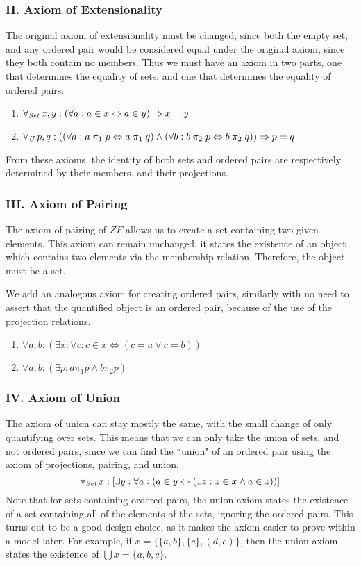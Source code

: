 \documentclass[11pt]{report}
\newcommand{\all}[1]{\forall_{\mathit{#1}}\hspace{0.5mm}}
\newcommand{\pleft}{\mathrel{\pi_1}}
\newcommand{\pright}{\mathrel{\pi_2}}
\theoremstyle{definition}
\theoremstyle{theorem}
\theoremstyle{lemma}
\begin{document}
\subsubsection*{II. Axiom of Extensionality}
The original axiom of extensionality must be changed, since both the empty set, and any ordered pair would be considered equal under the original axiom, since they both contain no members.
Thus we must have an axiom in two parts, one that determines the equality of sets, and one that determines the equality of ordered pairs.
\begin{enumerate}[label=(\roman*)]
\item $\all{Set} x,y:
        (\forall a:
          a\in x \Leftrightarrow a\in y) \Rightarrow x=y$
\item $\all{U} p,q: ((\forall a: a\pleft p \Leftrightarrow a\pleft q)
             \wedge (\forall b: b\pright p \Leftrightarrow b\pright q))
             \Rightarrow p=q$
\end{enumerate}
From these axioms, the identity of both sets and ordered pairs are respectively determined by their members, and their projections. 

\subsubsection*{III. Axiom of Pairing}
The axiom of pairing of $\mathit{ZF}$ allows us to create a set containing two given elements.
This axiom can remain unchanged, it states the existence of an object which contains two elements via the membership relation.
Therefore, the object must be a set.

We add an analogous axiom for creating ordered pairs, similarly with no need to assert that the quantified object is an ordered pair, because of the use of the projection relations.
\begin{enumerate}[label=(\roman*)]
\item $\forall a,b: (\exists x: \forall c:
          c\in x \Leftrightarrow (c=a \vee c=b))$
\item $\forall a,b: (\exists p: a\pleft p \wedge b\pright p)$
\end{enumerate}

\subsubsection*{IV. Axiom of Union}
The axiom of union can stay mostly the same, with the small change of only quantifying over sets.
This means that we can only take the union of sets, and not ordered pairs, since we can find the ``union" of an ordered pair using the axiom of projections, pairing, and union.
$$\all{Set}x: [\exists y:\forall a:
    (a\in y \Leftrightarrow (\exists z: z\in x \wedge a\in z))]$$
Note that for sets containing ordered pairs, the union axiom states the existence of a set containing all of the elements of the sets, ignoring the ordered pairs.
This turns out to be a good design choice, as it makes the axiom easier to prove within a model later.
For example, if $x=\{\{a,b\},\{c\},(d,e)\}$, then the union axiom states the existence of $\bigcup x=\{a,b,c\}$.
\end{document}
